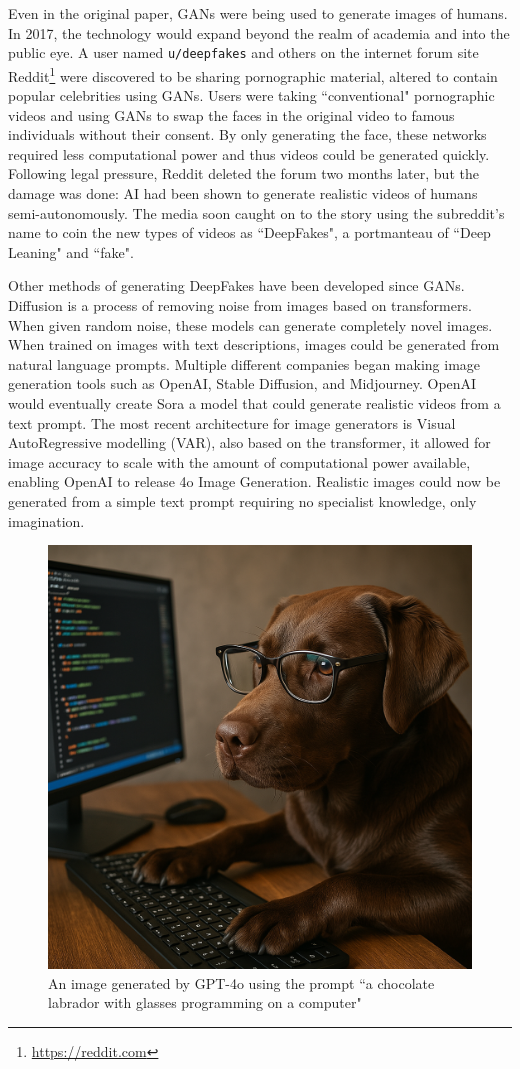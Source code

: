 Even in the original paper, GANs were being used to generate images of humans\cite{goodfellow2014generative}. In 2017, the technology would expand beyond the realm of academia and into the public eye. A user named \verb|u/deepfakes| and others on the internet forum site Reddit\footnote{\url{https://reddit.com}} were discovered to be sharing pornographic material, altered to contain popular celebrities using GANs\cite{cole2018reddit}. Users were taking ``conventional" pornographic videos and using GANs to swap the faces in the original video to famous individuals without their consent. By only generating the face, these networks required less computational power and thus videos could be generated quickly. Following legal pressure, Reddit deleted the forum two months later\cite{cole2018reddit}, but the damage was done: AI had been shown to generate realistic videos of humans semi-autonomously. The media soon caught on to the story using the subreddit's name to coin the new types of videos as ``DeepFakes", a portmanteau of ``Deep Leaning" and ``fake".

Other methods of generating DeepFakes have been developed since GANs. Diffusion\cite{rombach2022high} is a process of removing noise from images based on transformers\cite{vaswani2017attention}. When given random noise, these models can generate completely novel images. When trained on images with text descriptions, images could be generated from natural language prompts. Multiple different companies began making image generation tools such as OpenAI\cite{ramesh2022hierarchical}, Stable Diffusion\cite{stablediffusion2022}, and Midjourney\cite{midjourney2022}. OpenAI would eventually create Sora\cite{brooks2024video} a model that could generate realistic videos from a text prompt. The most recent architecture for image generators is Visual AutoRegressive modelling (VAR)\cite{tian2024visual}, also based on the transformer, it allowed for image accuracy to scale with the amount of computational power available, enabling OpenAI to release 4o Image Generation\cite{4oimagegen}. Realistic images could now be generated from a simple text prompt requiring no specialist knowledge, only imagination.

\begin{figure}[H]
    \centering
    \includegraphics[width=0.5\linewidth]{dissertation//figures/gpt4o.png}
    \caption{An image generated by GPT-4o\cite{4oimagegen} using the prompt ``a chocolate labrador with glasses programming on a computer"}
    \label{fig:gpt4o-dog}
\end{figure}

